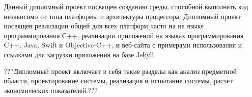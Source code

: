 Данный дипломный проект посвящен созданию среды, способной выполнять код независимо от типа платформы и архитектуры процессора.
Дипломный проект посвящен реализации общей для всех платформ части на на языке программирования С++, реализации приложений на языках программирования C++, Java, Swift и Objective-C++, и веб-сайта с примерами использования и ссылками для загрузки приложения на базе Jekyll.

???Дипломный проект включает в себя такие разделы как
анализ предметной области,
проектирование системы,
реализация и испытание системы,
расчет экономических показателей.???
